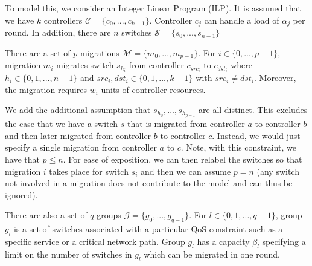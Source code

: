 \documentclass[conference]{IEEEtran}
\begin{document}
To model this, we consider an Integer Linear Program (ILP). It is assumed that we have $k$ controllers $\mathcal{C} = \{c_{0}, ..., c_{k-1}\}$. Controller $c_{j}$ can handle a load of $\alpha_{j}$ per round. In addition, there are $n$ switches $\mathcal{S} = \{s_{0}, ..., s_{n-1}\}$

There are a set of $p$ migrations $\mathcal{M} = \{m_{0}, ..., m_{p-1}\}$. For $i \in \{0, ..., p-1\}$, migration $m_{i}$ migrates switch $s_{h_{i}}$ from controller $c_{src_{i}}$ to $c_{dst_{i}}$ where $h_{i} \in \{0, 1, ..., n - 1\}$ and $src_{i}, dst_{i} \in \{0, 1, ..., k - 1\}$ with $src_{i} \neq dst_{i}$. Moreover, the migration requires $w_{i}$ units of controller resources. 

We add the additional assumption that $s_{h_{0}}, ..., s_{h_{p-1}}$ are all distinct. This excludes the case that we have a switch $s$ that is migrated from controller $a$ to controller $b$ and then later migrated from controller $b$ to controller $c$. Instead, we would just specify a single migration from controller $a$ to $c$. Note, with this constraint, we have that $p \leq n$. For ease of exposition, we can then relabel the switches so that migration $i$ takes place for switch $s_{i}$ and then we can assume $p = n$ (any switch not involved in a migration does not contribute to the model and can thus be ignored).

There are also a set of $q$ groups $\mathcal{G} = \{g_{0}, ..., g_{q-1}\}$. For $l \in \{0, 1, ..., q - 1\}$, group $g_{l}$ is a set of switches associated with a particular QoS constraint such as a specific service or a critical network path. Group $g_{l}$ has a capacity $\beta_{l}$ specifying a limit on the number of switches in $g_{l}$ which can be migrated in one round.
\end{document}
